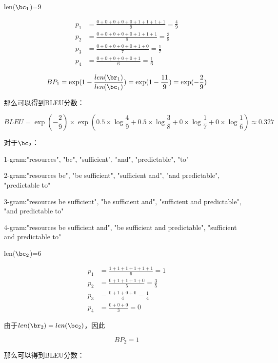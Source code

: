 \begin{parts}
\begin{subparts}
{        len($\bc_{1}$)=9

        \begin{align*}
            p_{1} &= \frac{0 + 0 + 0 + 0 + 0 + 1 + 1 + 1 + 1}{9} = \frac{4}{9} \\
            p_{2} &= \frac{0 + 0 + 0 + 0 + 0 + 1 + 1 + 1}{8} = \frac{3}{8} \\
            p_{3} &= \frac{0 + 0 + 0 + 0 + 0 + 1 + 0}{7} = \frac{1}{7} \\
            p_{4} &= \frac{0 + 0 + 0 + 0 + 0 + 1}{6} = \frac{1}{6}
        \end{align*}

        $$
            BP_{1} = \exp(1 - \frac{len(\br_{1})}{len(\bc_{1})}) = \exp(1 - \frac{11}{9}) = \exp(-\frac{2}{9})
        $$

        那么可以得到BLEU分数：

        $$
            BLEU = \exp(-\frac{2}{9}) \times \exp(0.5 \times \log{\frac{4}{9}} + 0.5 \times \log{\frac{3}{8}} + 0 \times \log{\frac{1}{7}} + 0 \times \log{\frac{1}{6}}) \approx 0.327
        $$

        对于$\bc_{2}$：

        1-gram:{"resources", "be", "sufficient", "and", "predictable", "to"}

        2-gram:{"resources be", "be sufficient", "sufficient and", "and predictable", "predictable to"}

        3-gram:{"resources be sufficient", "be sufficient and", "sufficient and predictable", "and predictable to"}
        
        4-gram:{"resources be sufficient and", "be sufficient and predictable", "sufficient and predictable to"}

        len($\bc_{2}$)=6

        \begin{align*}
            p_{1} &= \frac{1 + 1 + 1 + 1 + 1 + 1}{6} = 1 \\
            p_{2} &= \frac{0 + 1 + 1 + 1 + 0}{5} = \frac{3}{5} \\
            p_{3} &= \frac{0 + 1 + 0 + 0}{4} = \frac{1}{4} \\
            p_{4} &= \frac{0 + 0  + 0}{3} = 0
        \end{align*}

        由于$len(\br_{2})=len(\bc_{2})$，因此

        $$
            BP_{2} = 1
        $$

        那么可以得到BLEU分数：

}
\end{subparts}
\end{parts}
